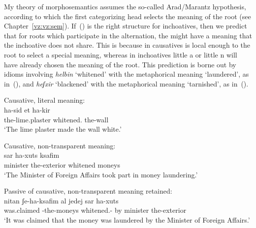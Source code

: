 \begin{exe}
\begin{xlist}
\begin{xlist}
\begin{exe}
\begin{exe}
\begin{xlist}
\begin{exe}
\begin{xlist}
\begin{exe}
\begin{xlist}
\begin{xlist}
\begin{exe}
\begin{xlist}
\begin{exe}
\begin{xlist}
\begin{exe}
\begin{exe}
\begin{exe}
\begin{xlist}
\begin{exe}
My theory of morphosemantics assumes the so-called Arad/Marantz hypothesis, according to which the first categorizing head selects the meaning of the root (see Chapter~\ref{vz:vz:sem}). If~(\lastx) is the right structure for inchoatives, then we predict that for roots which participate in the alternation, the  might have a meaning that the inchoative does not share. This is because in causatives {\vd} is local enough to the root to select a special meaning, whereas in inchoatives little a or little n will have already chosen the meaning of the root. This prediction is borne out by idioms involving \emph{helbin} `whitened' with the metaphorical meaning `laundered', as in~(\nextx), and \emph{heʃxir} `blackened' with the metaphorical meaning `tarnished', as in~(\anextx).
 \begin{exe}
 \ex  
 \begin{xlist} 
 	\ex  Causative, literal meaning: \\
	{ \gll ha-sid  et ha-kir\\
 			  the-lime.plaster whitened.  the-wall\\
 			\glt `The lime plaster made the wall white.' } 
		
 	\ex  Causative, non-transparent meaning: \\
	{ \gll sar ha-xuts  ksafim\\
 			  minister the-exterior whitened moneys\\
 			\glt `The Minister of Foreign Affairs took part in money laundering.' } 
		
 	\ex  Passive of causative, non-transparent meaning retained: 	\\	
	{ \gll nitan ʃe-ha-ksafim  {al jedej} sar ha-xuts\\
 			  was.claimed -the-moneys whitened.- by minister the-exterior\\
 			\glt `It was claimed that the money was laundered by the Minister of Foreign Affairs.' } 
		

\end{xlist}
\end{exe}
\end{exe}
\end{xlist}
\end{exe}
\end{exe}
\end{exe}
\end{xlist}
\end{exe}
\end{xlist}
\end{exe}
\end{xlist}
\end{xlist}
\end{exe}
\end{xlist}
\end{exe}
\end{xlist}
\end{exe}
\end{exe}
\end{xlist}
\end{xlist}
\end{exe}
